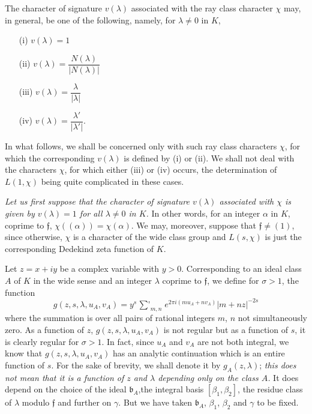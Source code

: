 The character of signature $v(\lambda)$ associated with the ray class
character $\chi$ may, in general, be one of the following, namely, for
$\lambda\neq 0$ in $K$,
\begin{itemize}
\item[(i)] $v(\lambda)=1$

\item[(ii)] $v(\lambda)=\dfrac{N(\lambda)}{|N(\lambda)|}$

\item[(iii)] $v(\lambda)=\dfrac{\lambda}{|\lambda|}$

\item[(iv)] $v(\lambda)=\dfrac{\lambda'}{|\lambda'|}$.
\end{itemize}
In what follows, we shall be concerned only with such ray class
characters $\chi$, for which the corresponding $v(\lambda)$ is defined
by (i) or (ii). We shall not deal with the characters $\chi$, for
which either (iii) or (iv) occurs, the determination of $L(1,\chi)$
being quite complicated in these cases.

{\em Let us first suppose that the character of signature $v(\lambda)$
  associated with $\chi$ is given by $v(\lambda)=1$ for all
  $\lambda\neq 0$ in $K$.} In other words, for an integer $\alpha$ in
$K$, coprime to $\mathfrak{f}$, $\chi((\alpha))=\chi(\alpha)$. We may,
moreover, suppose that $\mathfrak{f}\neq (1)$, since otherwise, $\chi$
is a character of the wide class group and $L(s,\chi)$ is just the
corresponding Dedekind zeta function of $K$.

Let $z=x+iy$ be a complex variable with $y>0$. Corresponding to an
ideal class $A$ of $K$ in the wide sense and an integer $\lambda$
coprime to $\mathfrak{f}$, we define for $\sigma>1$, the function
$$
g(z,s,\lambda,u_{A},v_{A})=y^{s}\mathop{{\sum}'}_{m,n}e^{2\pi
  i(mu_{A}+nv_{A})}|m+nz|^{-2s} 
$$
where the summation is over all pairs of rational integers $m$, $n$
not simultaneously zero. As a function of $z$,
$g(z,s,\lambda,u_{A},v_{A})$ is not regular but as a function of $s$,
it is clearly regular for $\sigma>1$. In fact, since $u_{A}$ and
$v_{A}$ are not both integral, we know that
$g(z,s,\lambda,u_{A},v_{A})$ has an analytic continuation which is an
entire function of $s$. For the sake of brevity, we shall denote it by
$g_{A}(z,\lambda)$; {\em this does not mean that it is a function of
  $z$ and $\lambda$ depending only on the class $A$.} It does depend
on the choice of the ideal $\mathfrak{b}_{A}$,\pageoriginale the integral basis
$[\beta_{1},\beta_{2}]$, the residue class of $\lambda$ modulo
$\mathfrak{f}$ and further on $\gamma$. But we have taken
$\mathfrak{b}_{A}$, $\beta_{1}$, $\beta_{2}$ and $\gamma$ to be fixed.

